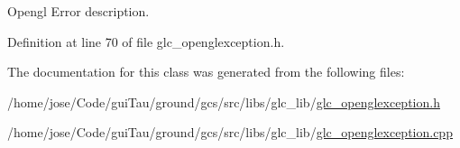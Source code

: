 Opengl Error description. 



Definition at line 70 of file glc\-\_\-openglexception.\-h.



The documentation for this class was generated from the following files\-:\begin{DoxyCompactItemize}
\item 
/home/jose/\-Code/gui\-Tau/ground/gcs/src/libs/glc\-\_\-lib/\hyperlink{glc__openglexception_8h}{glc\-\_\-openglexception.\-h}\item 
/home/jose/\-Code/gui\-Tau/ground/gcs/src/libs/glc\-\_\-lib/\hyperlink{glc__openglexception_8cpp}{glc\-\_\-openglexception.\-cpp}\end{DoxyCompactItemize}
